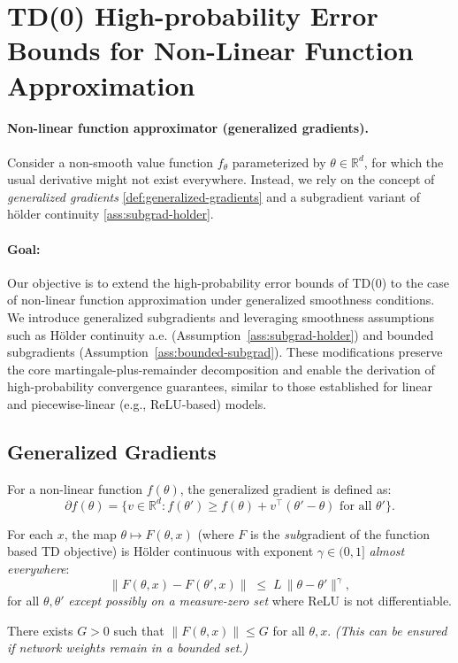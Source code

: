 \section{TD(0) High-probability Error Bounds for Non-Linear Function Approximation}

\paragraph{Non-linear function approximator (generalized gradients).}
Consider a non-smooth value function \(f_\theta\) parameterized by \(\theta\in\mathbb{R}^d\), for which the usual derivative might not exist everywhere. Instead, we rely on the concept of \emph{generalized gradients} \ref{def:generalized-gradients} and a subgradient variant of h\"older continuity \ref{ass:subgrad-holder}.

\paragraph{Goal:} Our objective is to extend the high-probability error bounds of TD(0) to the case of non-linear function approximation under generalized smoothness conditions. We introduce generalized subgradients and leveraging smoothness assumptions such as H\"older continuity a.e. (Assumption~\ref{ass:subgrad-holder}) and bounded subgradients (Assumption~\ref{ass:bounded-subgrad}). These modifications preserve the core martingale-plus-remainder decomposition and enable the derivation of high-probability convergence guarantees, similar to those established for linear and piecewise-linear (e.g., ReLU-based) models.


\subsection{Generalized Gradients}
\begin{definition}
\label{def:generalized-gradients}
For a non-linear function \(f(\theta)\), the generalized gradient is defined as:
\[
\partial f(\theta) = \{v \in \mathbb{R}^d : f(\theta') \geq f(\theta) + v^\top (\theta' - \theta) \text{ for all } \theta'\}.
\]
\end{definition}
\vspace{1em}
\begin{assumption}
\label{ass:subgrad-holder}
For each \(x\), the map \(\theta \mapsto F(\theta,x)\) (where \(F\) is the \emph{sub}gradient of the function based TD objective)  
is H\"older continuous with exponent \(\gamma \in (0,1]\) \emph{almost everywhere}:
\[
    \|F(\theta,x) - F(\theta',x)\| \;\le\; L\,\|\theta - \theta'\|^\gamma,
\]
for all \(\theta,\theta'\) \emph{except possibly on a measure-zero set} where ReLU is not differentiable.
\end{assumption}
\vspace{1em}
\begin{assumption}
\label{ass:bounded-subgrad}
There exists \(G>0\) such that \(\|F(\theta,x)\| \le G\) for all \(\theta,x\).  
\textit{(This can be ensured if network weights remain in a bounded set.)}
\end{assumption}

